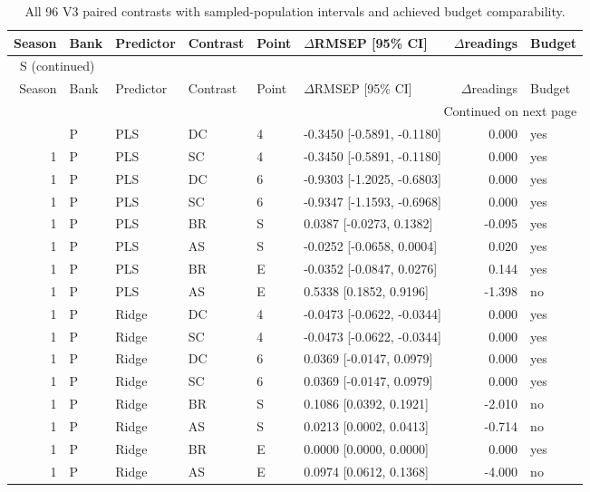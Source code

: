 \documentclass[10pt,a4paper]{article}
\renewcommand{\thetable}{S\arabic{table}}
\begin{document}
\clearpage
\begin{landscape}
\begingroup\footnotesize
\setlength{\tabcolsep}{3.5pt}
\renewcommand{\arraystretch}{1.10}
\begin{longtable}{rlllllrl}
\caption{All 96 V3 paired contrasts with sampled-population intervals and achieved budget comparability.}\label{tab:v3paired}\\
\toprule
Season & Bank & Predictor & Contrast & Point & $\Delta$RMSEP [95\% CI] & $\Delta$readings & Budget \\
\midrule
\endfirsthead
\multicolumn{8}{l}{\tablename~\thetable{} (continued)}\\
\toprule
Season & Bank & Predictor & Contrast & Point & $\Delta$RMSEP [95\% CI] & $\Delta$readings & Budget \\
\midrule
\endhead
\midrule
\multicolumn{8}{r}{Continued on next page}\\
\endfoot
\bottomrule
\endlastfoot
1 & P & PLS & DC & 4 & -0.3450 [-0.5891, -0.1180] & 0.000 & yes \\
1 & P & PLS & SC & 4 & -0.3450 [-0.5891, -0.1180] & 0.000 & yes \\
1 & P & PLS & DC & 6 & -0.9303 [-1.2025, -0.6803] & 0.000 & yes \\
1 & P & PLS & SC & 6 & -0.9347 [-1.1593, -0.6968] & 0.000 & yes \\
1 & P & PLS & BR & S & 0.0387 [-0.0273, 0.1382] & -0.095 & yes \\
1 & P & PLS & AS & S & -0.0252 [-0.0658, 0.0004] & 0.020 & yes \\
1 & P & PLS & BR & E & -0.0352 [-0.0847, 0.0276] & 0.144 & yes \\
1 & P & PLS & AS & E & 0.5338 [0.1852, 0.9196] & -1.398 & no \\
1 & P & Ridge & DC & 4 & -0.0473 [-0.0622, -0.0344] & 0.000 & yes \\
1 & P & Ridge & SC & 4 & -0.0473 [-0.0622, -0.0344] & 0.000 & yes \\
1 & P & Ridge & DC & 6 & 0.0369 [-0.0147, 0.0979] & 0.000 & yes \\
1 & P & Ridge & SC & 6 & 0.0369 [-0.0147, 0.0979] & 0.000 & yes \\
1 & P & Ridge & BR & S & 0.1086 [0.0392, 0.1921] & -2.010 & no \\
1 & P & Ridge & AS & S & 0.0213 [0.0002, 0.0413] & -0.714 & no \\
1 & P & Ridge & BR & E & 0.0000 [0.0000, 0.0000] & 0.000 & yes \\
1 & P & Ridge & AS & E & 0.0974 [0.0612, 0.1368] & -4.000 & no \\

\end{longtable}
\end{landscape}
\end{document}
